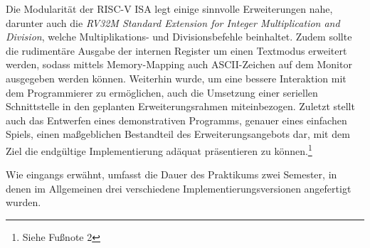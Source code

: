Die Modularit\"at der RISC-V ISA legt einige sinnvolle Erweiterungen nahe,
darunter auch die
\textit{RV32M Standard Extension for Integer Multiplication and Division},
welche Multiplikations- und Divisionsbefehle beinhaltet. Zudem sollte die
rudiment\"are Ausgabe der internen Register um einen Textmodus erweitert
werden, sodass mittels Memory-Mapping auch ASCII-Zeichen auf dem Monitor
ausgegeben werden k\"onnen. Weiterhin wurde, um eine bessere Interaktion mit
dem Programmierer zu erm\"oglichen, auch die Umsetzung einer seriellen
Schnittstelle in den geplanten Erweiterungsrahmen miteinbezogen. Zuletzt
stellt auch das Entwerfen eines demonstrativen Programms, genauer eines
einfachen Spiels, einen ma\ss{}geblichen Bestandteil des Erweiterungsangebots
dar, mit dem Ziel die endg\"ultige Implementierung ad\"aquat pr\"asentieren zu k\"onnen.\footnote{Siehe Fu\ss{}note 2}

Wie eingangs erw\"ahnt, umfasst die Dauer des Praktikums zwei Semester, in
denen im Allgemeinen drei verschiedene Implementierungsversionen angefertigt
wurden.

